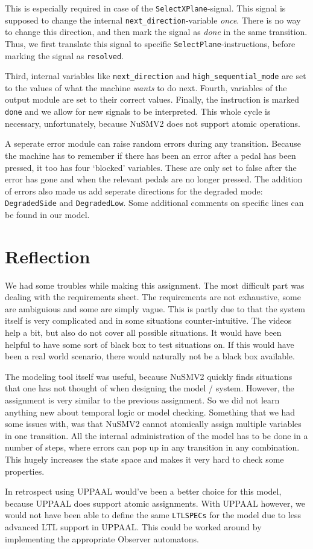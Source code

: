 \documentclass[a4paper,10pt]{article}
\begin{document}
	This is especially required in case of the \texttt{SelectXPlane}-signal.
	This signal is supposed to change the internal \texttt{next\_direction}-variable \emph{once}.
	There is no way to change this direction, and then mark the signal as \emph{done} in the same transition.
	Thus, we first translate this signal to specific \texttt{SelectPlane}-instructions, before marking the signal as \texttt{resolved}.

	Third, internal variables like \texttt{next\_direction} and \texttt{high\_sequential\_mode} are set to the values of what the machine \emph{wants} to do next.
	Fourth, variables of the output module are set to their correct values.
	Finally, the instruction is marked \texttt{done} and we allow for new signals to be interpreted.
	This whole cycle is necessary, unfortunately, because NuSMV2 does not support atomic operations.
	
	A seperate error module can raise random errors during any transition.
	Because the machine has to remember if there has been an error after a pedal has been pressed, it too has four `blocked' variables.
	These are only set to false after the error has gone and when the relevant pedals are no longer pressed.
	The addition of errors also made us add seperate directions for the degraded mode: \texttt{DegradedSide} and \texttt{DegradedLow}.
	Some additional comments on specific lines can be found in our model.

	\section{Reflection}
	We had some troubles while making this assignment.
	The most difficult part was dealing with the requirements sheet.
	The requirements are not exhaustive, some are ambiguious and some are simply vague.
	This is partly due to that the system itself is very complicated and in some situations counter-intuitive.
	The videos help a bit, but also do not cover all possible situations.
	It would have been helpful to have some sort of black box to test situations on.
	If this would have been a real world scenario, there would naturally not be a black box available.
	
	The modeling tool itself was useful, because NuSMV2 quickly finds situations that one has not thought of when designing the model / system.
	However, the assignment is very similar to the previous assignment.
	So we did not learn anything new about temporal logic or model checking.
	Something that we had some issues with, was that NuSMV2 cannot atomically assign multiple variables in one transition.
	All the internal administration of the model has to be done in a number of steps, where errors can pop up in any transition in any combination.
	This hugely increases the state space and makes it very hard to check some properties.
	
	In retrospect using UPPAAL would've been a better choice for this model, because UPPAAL does support atomic assignments.
	With UPPAAL however, we would not have been able to define the same \texttt{LTLSPECs} for the model due to less advanced LTL support in UPPAAL.
	This could be worked around by implementing the appropriate Observer automatons.
\end{document}
